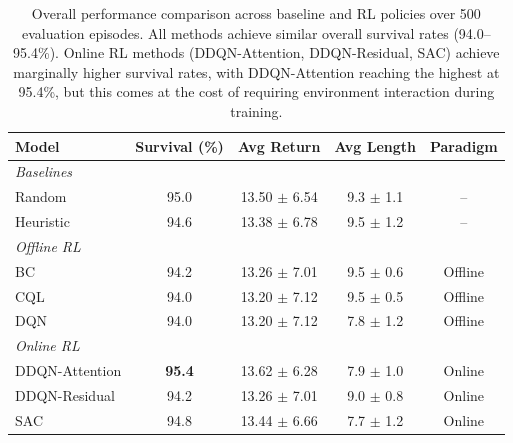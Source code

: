 \begin{table}[htbp]
\centering
\caption{Overall performance comparison across baseline and RL policies over 500 evaluation episodes. All methods achieve similar overall survival rates (94.0--95.4\%). Online RL methods (DDQN-Attention, DDQN-Residual, SAC) achieve marginally higher survival rates, with DDQN-Attention reaching the highest at 95.4\%, but this comes at the cost of requiring environment interaction during training.}
\label{tab:overall-performance}
\begin{tabular}{lcccc}
\toprule
\textbf{Model} & \textbf{Survival (\%)} & \textbf{Avg Return} & \textbf{Avg Length} & \textbf{Paradigm} \\
\midrule
\multicolumn{5}{l}{\textit{Baselines}} \\
Random          & 95.0               & 13.50 $\pm$ 6.54    & 9.3 $\pm$ 1.1       & -- \\
Heuristic       & 94.6               & 13.38 $\pm$ 6.78    & 9.5 $\pm$ 1.2       & -- \\
\midrule
\multicolumn{5}{l}{\textit{Offline RL}} \\
BC              & 94.2               & 13.26 $\pm$ 7.01    & 9.5 $\pm$ 0.6       & Offline \\
CQL             & 94.0               & 13.20 $\pm$ 7.12    & 9.5 $\pm$ 0.5       & Offline \\
DQN             & 94.0               & 13.20 $\pm$ 7.12    & 7.8 $\pm$ 1.2       & Offline \\
\midrule
\multicolumn{5}{l}{\textit{Online RL}} \\
DDQN-Attention  & \textbf{95.4}      & 13.62 $\pm$ 6.28    & 7.9 $\pm$ 1.0       & Online \\
DDQN-Residual   & 94.2               & 13.26 $\pm$ 7.01    & 9.0 $\pm$ 0.8       & Online \\
SAC             & 94.8               & 13.44 $\pm$ 6.66    & 7.7 $\pm$ 1.2       & Online \\
\bottomrule
\end{tabular}
\end{table}

